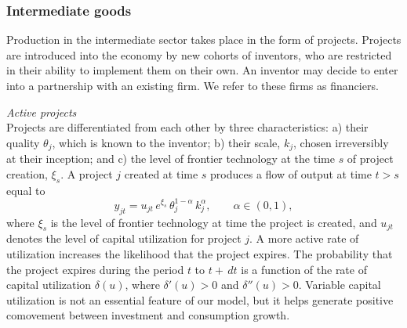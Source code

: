 \documentclass[12pt]{article}
\def\f{f}
\begin{document}
\subsubsection{Intermediate goods}

Production in the intermediate sector takes place in the form of projects. Projects are introduced into the economy by new cohorts of inventors, who are restricted in their ability to implement them on their own. An inventor may decide to enter into a partnership with an existing firm. We refer to these firms as financiers.


\vspace{0.5cm}
\noindent\emph{Active projects}\\
Projects are differentiated from each other by three characteristics: a) their quality $\theta_j$, which is known to the inventor; b) their scale, $k_j$, chosen irreversibly at their inception; and c) the level of frontier technology at the time $s$ of project creation, $\xi_s$. A project $j$ created at time $s$ produces a flow of output at time $t>s$ equal to
\begin{equation}\label{eqn:OUTPUT_C}
y_{jt} =  u_{jt}  \,e^{ \xi_s} \, \theta_j^{1-\alpha} \, k_j^{\alpha}, \qquad \alpha\in(0,1),
\end{equation}
where $\xi_s$ is the level of frontier technology at time the project is created, and $u_{jt}$ denotes the level of capital utilization for project $j$. A more active rate of utilization increases the likelihood that the project expires. The probability that the project expires during the period $t$ to $t+\,dt$ is a function of the rate of capital utilization $\delta(u)$, where $\delta'(u)>0$ and $\delta''(u)>0$. Variable capital utilization is not an essential feature of our model, but it helps generate positive comovement between investment and consumption growth.
\end{document}
